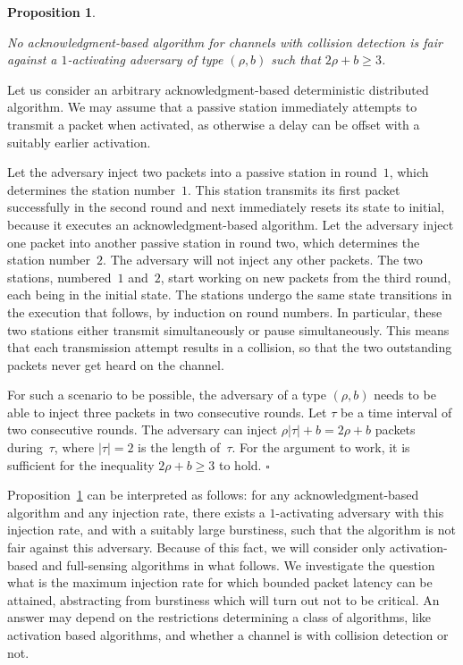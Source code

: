 \documentclass[11pt]{article}
\newcommand{\qed}{\hfill $\square$ \smallbreak}
\newenvironment{proof}{\noindent{\bf Proof:}}{\qed}
\newtheorem{proposition}{Proposition}
\begin{document}
\begin{proposition}
\label{pro:acknowledgment-impossibility}

No acknowledgment-based algorithm for channels with collision detection is fair against a $1$-activating adversary of type $(\rho,b)$ such that $2\rho + b\ge 3$.
\end{proposition}

\begin{proof} 
Let us consider an arbitrary acknowledgment-based deterministic distributed algorithm.
We may assume that a passive station immediately attempts to transmit a packet when activated, as otherwise a delay can be offset with a suitably earlier activation.

Let the adversary inject two packets into a passive station in round~$1$, which determines the station number~$1$.
This station transmits its first packet successfully in the second round and next immediately resets its state to initial, because it executes an acknowledgment-based algorithm.
Let the adversary inject one packet into another passive station in round two, which determines the station number~$2$.
The adversary will not inject any other packets.
The two stations, numbered~$1$ and~$2$, start working on new packets from the third round, each being in the initial state.
The stations undergo the same state transitions in the execution that follows,  by induction on round numbers.
In particular, these two stations either transmit simultaneously or pause simultaneously.
This means that each transmission attempt results in a collision, so that the two outstanding packets never get heard on the channel.

For such a scenario to be possible, the adversary of a type $(\rho,b)$ needs to be able to inject three packets in two consecutive rounds.
Let $\tau$ be a time interval of two consecutive rounds.
The adversary can inject $\rho|\tau|+b = 2\rho + b$ packets during~$\tau$, where $|\tau|=2$ is the length of~$\tau$.
For the argument to work, it is sufficient for the inequality $2\rho + b\ge 3$ to hold.
\end{proof} 

Proposition~\ref{pro:acknowledgment-impossibility} can be interpreted as follows: for any acknowledgment-based algorithm and any injection rate, there exists a $1$-activating adversary with this injection rate, and with a suitably large burstiness, such that the algorithm is not fair against this adversary.
Because of this fact, we will consider only activation-based and full-sensing algorithms in what follows.
We investigate the question what is the maximum injection rate for which bounded packet latency can be attained, abstracting from burstiness which will turn out not to be critical. 
An answer may depend on the restrictions determining a class of algorithms, like activation based algorithms, and whether a channel is with collision detection or not.
\end{document}
